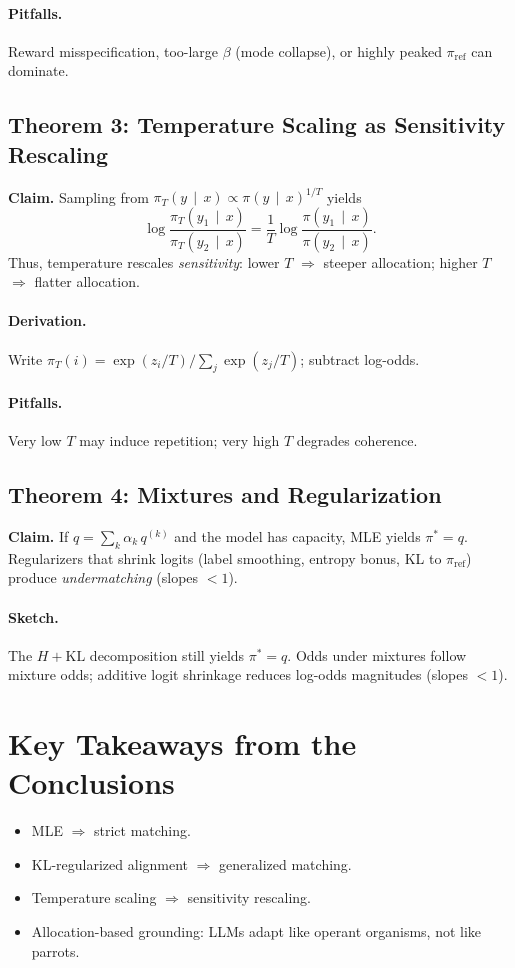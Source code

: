 \documentclass[11pt]{article}
\newcommand{\KL}{\mathrm{KL}}
\newcommand{\given}{\,\mid\,}
\begin{document}
\paragraph{Pitfalls.} Reward misspecification, too-large $\beta$ (mode collapse), or highly peaked $\pi_{\mathrm{ref}}$ can dominate.

\subsection{Theorem 3: Temperature Scaling as Sensitivity Rescaling}
\textbf{Claim.} Sampling from $\pi_T(y\given x)\propto \pi(y\given x)^{1/T}$ yields
\begin{equation*}
\log\frac{\pi_T(y_1\given x)}{\pi_T(y_2\given x)}=\frac{1}{T}\log\frac{\pi(y_1\given x)}{\pi(y_2\given x)}.
\end{equation*}
Thus, temperature rescales \emph{sensitivity}: lower $T$ $\Rightarrow$ steeper allocation; higher $T$ $\Rightarrow$ flatter allocation.

\paragraph{Derivation.} Write $\pi_T(i)=\exp(z_i/T)/\sum_j \exp(z_j/T)$; subtract log-odds.

\paragraph{Pitfalls.} Very low $T$ may induce repetition; very high $T$ degrades coherence.

\subsection{Theorem 4: Mixtures and Regularization}
\textbf{Claim.} If $q=\sum_k \alpha_k\,q^{(k)}$ and the model has capacity, MLE yields $\pi^*=q$. Regularizers that shrink logits (label smoothing, entropy bonus, KL to $\pi_{\mathrm{ref}}$) produce \emph{undermatching} (slopes $<1$).

\paragraph{Sketch.} The $H+\KL$ decomposition still yields $\pi^*=q$. Odds under mixtures follow mixture odds; additive logit shrinkage reduces log-odds magnitudes (slopes $<1$).

\section{Key Takeaways from the Conclusions}
\begin{itemize}[leftmargin=*]
  \item MLE $\Rightarrow$ strict matching.  
  \item KL-regularized alignment $\Rightarrow$ generalized matching.  
  \item Temperature scaling $\Rightarrow$ sensitivity rescaling.  
  \item Allocation-based grounding: LLMs adapt like operant organisms, not like parrots.  
\end{itemize}
\end{document}
